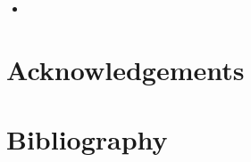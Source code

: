 \documentclass[
  11pt,
]{article}
\theoremstyle{nonumberplain}
\begin{document}
\begin{itemize}
\item 
\end{itemize}


\hypertarget{acknowledgements}{%
\section*{Acknowledgements}\label{acknowledgements}}


\hypertarget{bibliography}{%
\section*{Bibliography}\label{bibliography}}

\hypertarget{refs}{}
\end{document}
